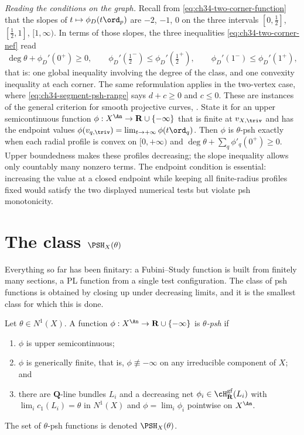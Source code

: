 \begin{example}
\emph{Reading the conditions on the graph.}  Recall from
\eqref{eq:ch34-two-corner-function} that the slopes of
$t\mapsto\phi_D(t\ord_p)$ are $-2$, $-1$, $0$ on the three
intervals $[0,\tfrac12]$, $[\tfrac12,1]$, $[1,\infty)$.  In terms of
those slopes, the three inequalities \eqref{eq:ch34-two-corner-nef} read
\[
 \deg\theta+\phi_D'(0^+)\ge0,
 \qquad
 \phi_D'(\tfrac12^-)\le\phi_D'(\tfrac12^+),
 \qquad
 \phi_D'(1^-)\le\phi_D'(1^+),
\]
that is: one global inequality involving the degree of the class, and one
convexity inequality at each corner.  The same reformulation applies in the
two-vertex case, where \eqref{eq:ch34-segment-psh-range} says
$d+c\ge0$ and $c\le0$.  These are instances of the general criterion for
smooth projective curves, \cite[Example~4.13]{BJ22}.
State it for an upper semicontinuous function
$\phi:X^{\An}\to\mathbf R\cup\{-\infty\}$ that is finite at
$v_{X,\triv}$ and has the endpoint values
$\phi(v_{q,\triv})=\lim_{t\to+\infty}\phi(t\ord_q)$.
Then $\phi$ is $\theta$-psh exactly when each radial profile is
convex on $[0,+\infty)$ and
$\deg\theta+\sum_q\phi'_q(0^+)\ge0$.
Upper boundedness makes these profiles decreasing; the slope inequality
allows only countably many nonzero terms.
The endpoint condition is essential: increasing the value at a closed
endpoint while keeping all finite-radius profiles fixed would satisfy
the two displayed numerical tests but violate psh monotonicity.
\end{example}

\section{The class \texorpdfstring{$\PSH_X(\theta)$}{PSH(theta)}}
\label{sec:ch34-psh}

Everything so far has been finitary: a Fubini--Study function is built from
finitely many sections, a PL function from a single test configuration.  The
class of psh functions is obtained by closing up under decreasing limits,
and it is the smallest class for which this is done.

\begin{definition}
\label{def:bj-psh}
Let $\theta\in N^1(X)$.  A function
$\phi:X^{\An}\to\mathbf R\cup\{-\infty\}$ is \emph{$\theta$-psh} if
\begin{enumerate}
\item $\phi$ is upper semicontinuous;
\item $\phi$ is generically finite, that is, $\phi\not\equiv-\infty$ on
      any irreducible component of $X$; and
\item there are $\mathbf Q$-line bundles $L_i$ and a decreasing net
      $\phi_i\in\cH^{\mathrm{gf}}_{\mathbf R}(L_i)$ with
      $\lim_i c_1(L_i)=\theta$ in $N^1(X)$ and $\phi=\lim_i\phi_i$
      pointwise on $X^{\An}$.
\end{enumerate}
The set of $\theta$-psh functions is denoted $\PSH_X(\theta)$.
\end{definition}

